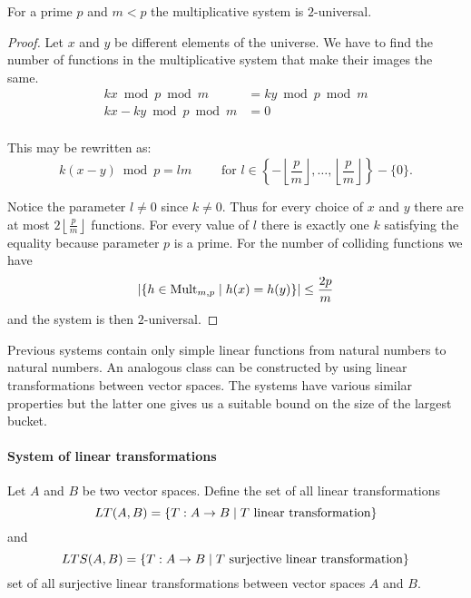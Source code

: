 \begin{theorem}
For a prime $p$ and $m < p$ the multiplicative system is $2$-universal.
\end{theorem}
\begin{proof}
Let $x$ and $y$ be different elements of the universe. We have to find the number of functions in the multiplicative system that make their images the same.
\begin{displaymath}
\begin{split}
kx \bmod p \bmod m & = ky \bmod p \bmod m \\
kx - ky \bmod p \bmod m & = 0 \\
\end{split}
\end{displaymath}

This may be rewritten as:
\begin{displaymath}
k(x - y) \bmod p = l m \qquad \text{ for  } l \in \left\lbrace -\left\lfloor\frac{p}{m}\right\rfloor, \dots, \left\lfloor\frac{p}{m}\right\rfloor \right\rbrace - \{0\} \text{.}
\end{displaymath}

Notice the parameter $l \neq 0$ since $k \neq 0$. Thus for every choice of $x$ and $y$ there are at most $2\left\lfloor\frac{p}{m}\right\rfloor$ functions. For every value of $l$ there is exactly one $k$ satisfying the equality because parameter $p$ is a prime. For the number of colliding functions we have \[ | \lbrace h \in \mathrm{Mult}_{m,p} \mid h(x) = h(y) \rbrace | \leq \frac{2p}{m} \] and the system is then $2$-universal.
\end{proof}

Previous systems contain only simple linear functions from natural numbers to natural numbers. An analogous class can be constructed by using linear transformations between vector spaces. The systems have various similar properties but the latter one gives us a suitable bound on the size of the largest bucket.

\paragraph{System of linear transformations}
\begin{definition}
\label{definition-linear-transformations}
Let $A$ and $B$ be two vector spaces. Define the set of all linear transformations
\[
LT(A, B) = \{ T: A \rightarrow B \mid T \text{ linear transformation} \}
\]
and
\[
LTS(A, B) = \{ T: A \rightarrow B \mid T \text{ surjective linear transformation} \}
\] set of all surjective linear transformations between vector spaces $A$ and $B$.
\end{definition} 

